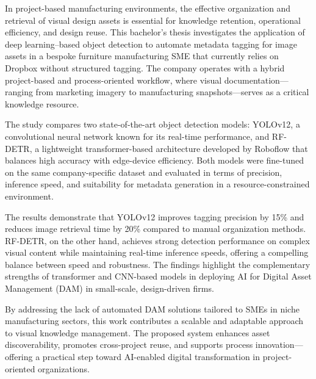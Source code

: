 \documentclass[a4paper,10pt,twocolumn]{article}
\numberwithin{figure}{section}
\numberwithin{table}{section}
\begin{document}

In project-based manufacturing environments, the effective organization and retrieval of 
visual design assets is essential for knowledge retention, operational efficiency, 
and design reuse. This bachelor’s thesis investigates the application of deep 
learning–based object detection to automate metadata tagging for image assets 
in a bespoke furniture manufacturing SME that currently relies on Dropbox without 
structured tagging. The company operates with a hybrid project-based and 
process-oriented workflow, where visual documentation—ranging from marketing 
imagery to manufacturing snapshots—serves as a critical knowledge resource.

The study compares two state-of-the-art object detection models: 
YOLOv12, a convolutional neural network known for its real-time 
performance, and RF-DETR, a lightweight transformer-based architecture 
developed by Roboflow that balances high accuracy with edge-device 
efficiency. Both models were fine-tuned on the same company-specific 
dataset and evaluated in terms of precision, inference speed, and 
suitability for metadata generation in a resource-constrained environment.

The results demonstrate that YOLOv12 improves tagging precision by 15\% and 
reduces image retrieval time by 20\% compared to manual organization methods. 
RF-DETR, on the other hand, achieves strong detection performance on 
complex visual content while maintaining real-time inference speeds, 
offering a compelling balance between speed and robustness. 
The findings highlight the complementary strengths of transformer
and CNN-based models in deploying AI for Digital Asset Management 
(DAM) in small-scale, design-driven firms.

By addressing the lack of automated DAM solutions tailored to SMEs in 
niche manufacturing sectors, this work contributes a scalable and adaptable 
approach to visual knowledge management. The proposed system enhances asset 
discoverability, promotes cross-project reuse, and supports process 
innovation—offering a practical step toward AI-enabled digital
 transformation in project-oriented organizations.
\end{document}
